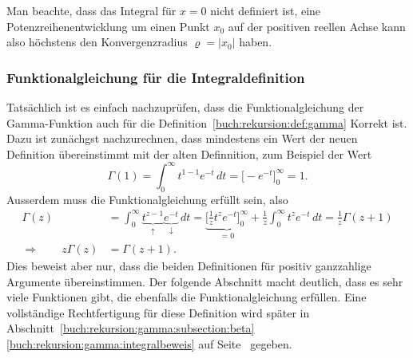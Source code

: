 Man beachte, dass das Integral für $x=0$ nicht definiert ist, eine
Potenzreihenentwicklung um einen Punkt $x_0$ auf der positiven reellen
Achse kann also höchstens den Konvergenzradius $\varrho=|x_0|$ haben.

\subsubsection{Funktionalgleichung für die Integraldefinition}
Tatsächlich ist es einfach nachzuprüfen, dass die Funktionalgleichung
der Gamma-Funktion auch für die Definition~\ref{buch:rekursion:def:gamma}
Korrekt ist. 
Dazu ist zunächgst nachzurechnen, dass mindestens ein Wert der neuen 
Definition übereinstimmt mit der alten Definnition, zum Beispiel der
Wert
\[
\Gamma(1)
=
\int_0^\infty t^{1-1}e^{-t}\,dt
=
\biggl[ -e^{-t} \biggr]_0^\infty
=
1.
\]
Ausserdem muss die Funktionalgleichung erfüllt sein, also
\begin{align*}
\Gamma(z)
&=
\int_0^\infty
\underbrace{t^{z-1}}_{\displaystyle\uparrow}
\underbrace{e^{-t}}_{\displaystyle\downarrow}
\,dt
=
\underbrace{\biggl[
\frac{1}{z} t^z e^{-t}
\biggr]_0^\infty}_{\displaystyle=0}
+
\frac{1}{z}
\int_0^\infty
t^z e^{-t}
\,dt
=
\frac{1}{z}\Gamma(z+1)
\\
\Rightarrow\qquad
z\Gamma(z)&=\Gamma(z+1).
\end{align*}
Dies beweist aber nur, dass die beiden Definitionen für positiv
ganzzahlige Argumente übereinstimmen.
Der folgende Abschnitt macht deutlich, dass es sehr viele Funktionen gibt,
die ebenfalls die Funktionalgleichung erfüllen.
Eine vollständige Rechtfertigung für diese Definition wird später
in Abschnitt~\ref{buch:rekursion:gamma:subsection:beta}
\eqref{buch:rekursion:gamma:integralbeweis}
auf Seite~\pageref{buch:rekursion:gamma:integralbeweis}
gegeben.

